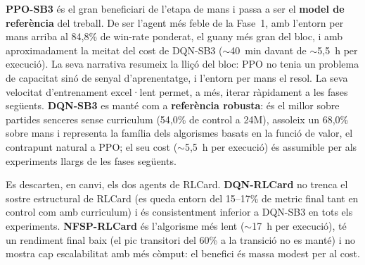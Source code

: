 \textbf{PPO-SB3} és el gran beneficiari de l'etapa de mans i passa a ser el \textbf{model de
referència} del treball. De ser l'agent més feble de la Fase~1, amb l'entorn per mans arriba al
84{,}8\% de win-rate ponderat, el guany més gran del bloc, i amb aproximadament la meitat del
cost de DQN-SB3 ($\sim$40~min davant de $\sim$5,5~h per execució). La seva narrativa resumeix
la lliçó del bloc: PPO no tenia un problema de capacitat sinó de senyal d'aprenentatge, i
l'entorn per mans el resol. La seva velocitat d'entrenament excel·lent permet, a més, iterar
ràpidament a les fases següents. \textbf{DQN-SB3} es manté com a \textbf{referència robusta}: és el
millor sobre partides senceres sense curriculum (54,0\% de control a 24M), assoleix un
68,0\% sobre mans i representa la família dels algorismes basats en la funció de valor, el
contrapunt natural a PPO; el seu cost ($\sim$5,5~h per execució) és assumible per als
experiments llargs de les fases següents.

Es descarten, en canvi, els dos agents de RLCard. \textbf{DQN-RLCard} no trenca el sostre
estructural de RLCard (es queda entorn del 15--17\% de \(\text{metric}\) final tant en
control com amb curriculum) i és consistentment inferior a DQN-SB3 en tots els experiments.
\textbf{NFSP-RLCard} és l'algorisme més lent ($\sim$17~h per execució), té un rendiment final
baix (el pic transitori del 60\% a la transició no es manté) i no mostra cap escalabilitat
amb més còmput: el benefici és massa modest per al cost.
